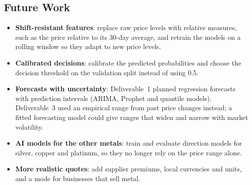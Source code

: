 \subsection{Future Work}

\begin{itemize}
  \item \textbf{Shift-resistant features}: replace raw price levels with
        relative measures, such as the price relative to its 30-day average,
        and retrain the models on a rolling window so they adapt to new price
        levels.
  \item \textbf{Calibrated decisions}: calibrate the predicted probabilities
        and choose the decision threshold on the validation split instead of
        using 0.5.
  \item \textbf{Forecasts with uncertainty}: Deliverable~1 planned regression
        forecasts with prediction intervals (ARIMA, Prophet and quantile
        models). Deliverable~3 used an empirical range from past price changes
        instead; a fitted forecasting model could give ranges that widen and
        narrow with market volatility.
  \item \textbf{AI models for the other metals}: train and evaluate direction
        models for silver, copper and platinum, so they no longer rely on the
        price range alone.
  \item \textbf{More realistic quotes}: add supplier premiums, local
        currencies and units, and a mode for businesses that sell metal.
\end{itemize}
